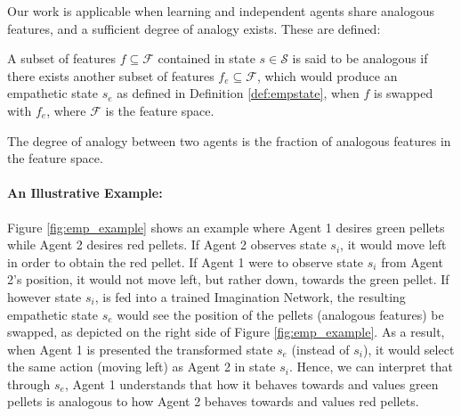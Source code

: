 Our work is applicable when learning and independent agents share analogous features, and a sufficient degree of analogy exists. These are defined:
\begin{definition}[Analogous features]
    A subset of features $f\subseteq \mathcal{F}$ contained in state $s\in\mathcal{S}$ is said to be analogous if there exists another subset of features $f_{e}\subseteq \mathcal{F}$, which would produce an empathetic state $s_e$ as defined in Definition \ref{def:empstate}, when $f$ is swapped with $f_e$, where $\mathcal{F}$ is the feature space.
\end{definition}
\begin{definition}
    The degree of analogy between two agents is the fraction of analogous features in the feature space.%
\end{definition}
\paragraph{An Illustrative Example:} Figure \ref{fig:emp_example} shows an example where Agent 1 desires green pellets while Agent 2 desires red pellets. If Agent 2 observes state $s_{i}$, it would move left in order to obtain the red pellet. If Agent 1 were to observe state $s_{i}$ from Agent 2's position, it would not move left, but rather down, towards the green pellet. If however state $s_{i}$, is fed into a trained Imagination Network, the resulting empathetic state $s_{e}$ would see the position of the pellets (analogous features) be swapped, as depicted on the right side of Figure \ref{fig:emp_example}. As a result, when Agent 1 is presented the transformed state $s_{e}$ (instead of $s_{i}$), it would select the same action (moving left) as Agent 2 in state $s_{i}$. Hence, we can interpret that through $s_{e}$, Agent 1 understands that how it behaves towards and values green pellets is analogous to how Agent 2 behaves towards and values red pellets. 

